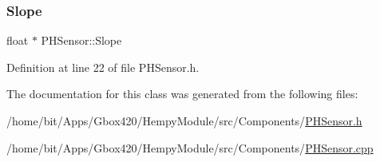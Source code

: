 \subsubsection{\texorpdfstring{Slope}{Slope}}
{\footnotesize\ttfamily float $\ast$ P\+H\+Sensor\+::\+Slope\hspace{0.3cm}{\ttfamily [protected]}}



Definition at line 22 of file P\+H\+Sensor.\+h.



The documentation for this class was generated from the following files\+:\begin{DoxyCompactItemize}
\item 
/home/bit/\+Apps/\+Gbox420/\+Hempy\+Module/src/\+Components/\hyperlink{_hempy_module_2src_2_components_2_p_h_sensor_8h}{P\+H\+Sensor.\+h}\item 
/home/bit/\+Apps/\+Gbox420/\+Hempy\+Module/src/\+Components/\hyperlink{_hempy_module_2src_2_components_2_p_h_sensor_8cpp}{P\+H\+Sensor.\+cpp}\end{DoxyCompactItemize}
